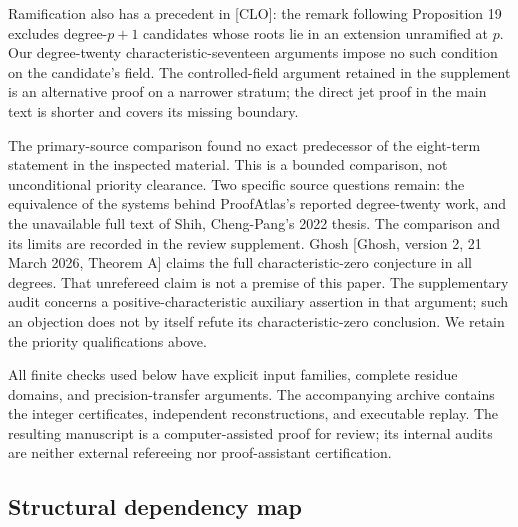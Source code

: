 \documentclass[
  british,
  10pt,
  a4paper,
]{article}
\begin{document}
Ramification also has a precedent in {[}CLO{]}: the remark following
Proposition 19 excludes degree-\(p+1\) candidates whose roots lie in an
extension unramified at \(p\). Our degree-twenty
characteristic-seventeen arguments impose no such condition on the
candidate's field. The controlled-field argument retained in the
supplement is an alternative proof on a narrower stratum; the direct jet
proof in the main text is shorter and covers its missing boundary.

The primary-source comparison found no exact predecessor of the
eight-term statement in the inspected material. This is a bounded
comparison, not unconditional priority clearance. Two specific source
questions remain: the equivalence of the systems behind ProofAtlas's
reported degree-twenty work, and the unavailable full text of Shih,
Cheng-Pang's 2022 thesis. The comparison and its limits are recorded in
the review supplement. Ghosh {[}Ghosh, version 2, 21 March 2026, Theorem
A{]} claims the full characteristic-zero conjecture in all degrees. That
unrefereed claim is not a premise of this paper. The supplementary audit
concerns a positive-characteristic auxiliary assertion in that argument;
such an objection does not by itself refute its characteristic-zero
conclusion. We retain the priority qualifications above.

All finite checks used below have explicit input families, complete
residue domains, and precision-transfer arguments. The accompanying
archive contains the integer certificates, independent reconstructions,
and executable replay. The resulting manuscript is a computer-assisted
proof for review; its internal audits are neither external refereeing
nor proof-assistant certification.

\subsection{Structural dependency map}\label{structural-dependency-map}
\end{document}
